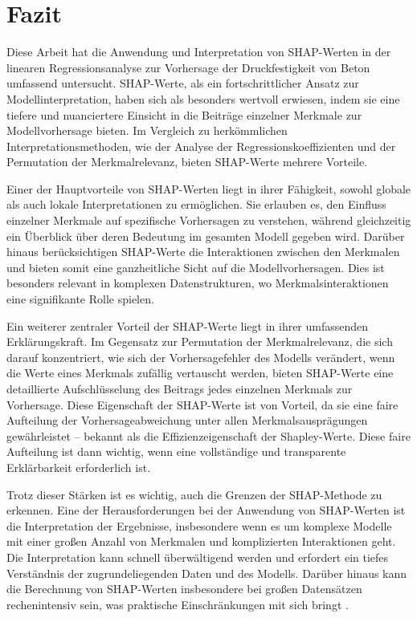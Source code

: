 \chapter{Fazit}

Diese Arbeit hat die Anwendung und Interpretation von SHAP-Werten in der 
linearen Regressionsanalyse zur Vorhersage der Druckfestigkeit von Beton umfassend untersucht. 
SHAP-Werte, als ein fortschrittlicher Ansatz zur Modellinterpretation, haben sich als besonders 
wertvoll erwiesen, indem sie eine tiefere und nuanciertere Einsicht in die Beiträge einzelner 
Merkmale zur Modellvorhersage bieten. Im Vergleich zu herkömmlichen Interpretationsmethoden, 
wie der Analyse der Regressionskoeffizienten und der Permutation der Merkmalrelevanz, 
bieten SHAP-Werte mehrere Vorteile.

Einer der Hauptvorteile von SHAP-Werten liegt in ihrer Fähigkeit, sowohl globale als auch 
lokale Interpretationen zu ermöglichen. Sie erlauben es, den Einfluss einzelner Merkmale auf 
spezifische Vorhersagen zu verstehen, während gleichzeitig ein Überblick über deren Bedeutung 
im gesamten Modell gegeben wird. Darüber hinaus berücksichtigen SHAP-Werte die Interaktionen 
zwischen den Merkmalen und bieten somit eine ganzheitliche Sicht auf die Modellvorhersagen. 
Dies ist besonders relevant in komplexen Datenstrukturen, wo Merkmalsinteraktionen eine signifikante
Rolle spielen.

Ein weiterer zentraler Vorteil der SHAP-Werte liegt in ihrer umfassenden Erklärungskraft.
Im Gegensatz zur Permutation der Merkmalrelevanz, die sich darauf konzentriert, wie sich der 
Vorhersagefehler des Modells verändert, wenn die Werte eines Merkmals zufällig vertauscht werden, 
bieten SHAP-Werte eine detaillierte Aufschlüsselung des Beitrags jedes einzelnen Merkmals zur 
Vorhersage. Diese Eigenschaft der SHAP-Werte ist von Vorteil, da sie eine faire 
Aufteilung der Vorhersageabweichung unter allen Merkmalsausprägungen gewährleistet – bekannt 
als die Effizienzeigenschaft der Shapley-Werte. Diese faire Aufteilung ist dann wichtig, 
wenn eine vollständige und transparente Erklärbarkeit erforderlich ist.

Trotz dieser Stärken ist es wichtig, auch die Grenzen der SHAP-Methode zu erkennen. 
Eine der Herausforderungen bei der Anwendung von SHAP-Werten ist die Interpretation der Ergebnisse, 
insbesondere wenn es um komplexe Modelle mit einer großen Anzahl von Merkmalen und komplizierten 
Interaktionen geht. Die Interpretation kann schnell überwältigend werden und erfordert ein tiefes 
Verständnis der zugrundeliegenden Daten und des Modells. Darüber hinaus kann die Berechnung von 
SHAP-Werten insbesondere bei großen Datensätzen rechenintensiv sein, was praktische Einschränkungen 
mit sich bringt \cite[S. 224]{Molnar_2022}.

